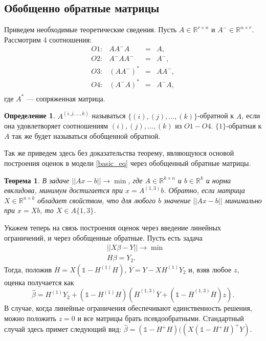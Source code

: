 \documentclass{spisok-article}
\newtheorem{mytheor}{Теорема}
\theoremstyle{definition}
\newtheorem*{mydef*}{Определение}
\begin{document}
\subsection{Обобщенно обратные матрицы}
Приведем необходимые теоретические сведения. Пусть $A \in \mathbb{R}^{r \times n}$ и $A^-\in \mathbb{R}^{n\times r}$. Рассмотрим 4 соотношения:
\[
\begin{matrix}
O1: & AA^-A & = & A,\\
O2: & A^-AA^-& = & A^-, \\
O3: & (AA^-)^* & = & AA^-,\\
O4: & (A^-A)^*& = & A^-A,\\
\end{matrix}
\]
где $A^*$ --- сопряженная матрица. 
\begin{mydef*}
$A^{(i,j, \dots, k)}$ называться $\{(i), (j), \dots, (k)\}$-обратной к $A$, если она удовлетворяет соотношениям $(i), (j), \dots, (k)$ из $O1-O4$. $\{1\}$-обратная к $A$ так же будет называться обобщенной обратной.
\end{mydef*}

Так же приведем здесь без доказательства теорему, являющуюся основой построения оценок в модели \eqref{basic_eq} через обобщенный обратные матрицы.
\begin{mytheor} \label{best_est_th}
В задаче $||Ax-b|| \to \min$, где $A \in \mathbb{R}^{k \times n}$ и $b \in \mathbb{R}^k$ и норма евклидова, минимум достигается при $x=A^{(1,3)}b$. Обратно, если матрица $X \in \mathbb{R}^{n \times k}$ обладает свойством, что для любого $b$ значение $||Ax-b||$ минимально при $x=Xb$, то $X \in A\{1,3\}$.
\end{mytheor}

Укажем теперь на связь построения оценок через введение линейных ограничений, и через обобщенные обратные. Пусть есть задача
\begin{align*}
&||X\beta - Y|| \to \min \\ 
&H\beta = Y_2.
\end{align*}
Тогда, положив $\overline{H} = X(\mathbb{1}-H^{(1)}H)$, $\overline{Y}=Y-XH^{(1)}Y_2$ и, взяв  любое $z$,  оценка получается как
\begin{equation*}
\hat{\beta}= H^{(1)}Y_2+\left(\mathbb{1}-H^{(1)}H\right)\left(\overline{H}^{(1,3)}\overline{Y}+(\mathbb{1}-\overline{H}^{(1,3)}\overline{H})z\right).
\end{equation*}
В случае, когда линейные ограничения обеспечивают единственность решения, можно положить $z = 0$ и все матрицы брать псевдообратными. Стандартный случай здесь примет следующий вид: $\hat{\beta}=(\mathbb{1} - H^+H)((X(\mathbb{1}-H^+H)^+Y)$. 
\end{document}
